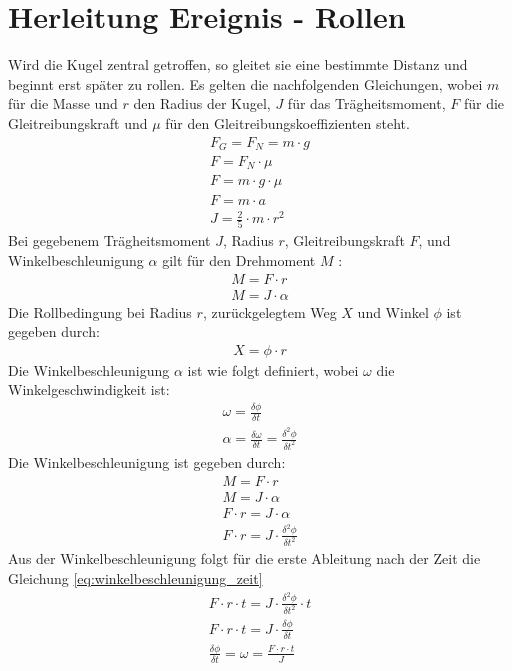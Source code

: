 \section{Herleitung Ereignis - Rollen}\label{anhang:herleitung:event:rollen}
Wird die Kugel zentral getroffen, so gleitet sie eine bestimmte Distanz und beginnt erst später zu rollen\cite{rollzeitpunkt}.
Es gelten die nachfolgenden Gleichungen, wobei $m$ für die Masse und $r$ den Radius der Kugel, $J$ für das
Trägheitsmoment, $F$ für die Gleitreibungskraft und $\mu$ für den Gleitreibungskoeffizienten steht.
\begin{align}
    F_G = F_N = m \cdot g\\
    F = F_N \cdot \mu\\
    F = m \cdot g \cdot \mu\\
    F = m \cdot a\\
    J = \frac{2}{5} \cdot m \cdot r^2
\end{align}
Bei gegebenem Trägheitsmoment $J$, Radius $r$, Gleitreibungskraft $F$, und Winkelbeschleunigung $\alpha$ gilt für den Drehmoment $M$ \cite{wiki.drehmoment:1}:
\begin{align}
    M = F \cdot r\\
    M = J \cdot \alpha
\end{align}
Die Rollbedingung\cite{wiki.rollen:1} bei Radius $r$, zurückgelegtem Weg $X$ und Winkel $\phi$ ist gegeben durch:
\begin{align}
    X = \phi \cdot r\label{eq:rollbedingung}
\end{align}
Die Winkelbeschleunigung $\alpha$ ist wie folgt definiert\cite{wiki.winkelbeschleunigung:1}, wobei $\omega$ die Winkelgeschwindigkeit ist:
\begin{align}
    \omega = \frac{\delta \phi}{\delta t}\\
    \alpha = \frac{\delta \omega}{\delta t} = \frac{\delta^2 \phi}{\delta t^2}
\end{align}
Die Winkelbeschleunigung ist gegeben durch:
\begin{align}
    M = F \cdot r\\
    M = J \cdot \alpha\\
    F \cdot r = J \cdot \alpha\\
    F \cdot r = J \cdot \frac{\delta^2 \phi}{\delta t^2}
\end{align}
Aus der Winkelbeschleunigung folgt für die erste Ableitung nach der Zeit die Gleichung \ref{eq:winkelbeschleunigung_zeit}
\begin{align}
    F \cdot r \cdot t = J \cdot \frac{\delta^2 \phi}{\delta t^2} \cdot t\\
    F \cdot r \cdot t = J \cdot \frac{\delta \phi}{\delta t}\\
    \frac{\delta \phi}{\delta t} = \omega = \frac{F \cdot r \cdot t}{J}\label{eq:winkelbeschleunigung_zeit}
\end{align}
